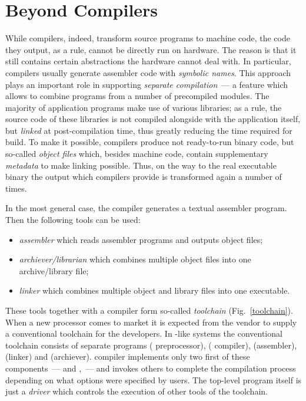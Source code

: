 \section{Beyond Compilers}

While compilers, indeed, transform source programs to machine code, the code they output, as a rule, cannot be directly run on hardware.
The reason is that it still contains certain abstractions the hardware cannot deal with. In particular, compilers usually generate
assembler code with \emph{symbolic names}. This approach plays an important role in supporting \emph{separate compilation}~--- a
feature which allows to combine programs from a number of precompiled modules. The majority of application programs
make use of various libraries; as a rule, the source code of these libraries is not compiled alongside with the application itself, but
\emph{linked} at post-compilation time, thus greatly reducing the time required for build. To make it possible, compilers
produce not ready-to-run binary code, but so-called \emph{object files} which, besides machine code, contain supplementary
\emph{metadata} to make linking possible. Thus, on the way to the real executable binary the output which compilers provide
is transformed again a number of times.

In the most general case, the compiler generates a textual assembler program. Then the following tools can be used:

\begin{itemize}
\item \emph{assembler} which reads assembler programs and outputs object files;
\item \emph{archiever/librarian} which combines multiple object files into one archive/library file;
\item \emph{linker} which combines multiple object and library files into one executable.
\end{itemize}

These tools together with a compiler form so-called \emph{toolchain} (Fig.~\ref{toolchain}). When a new processor comes to market it is expected from
the vendor to supply a conventional toolchain for the developers. In -like systems the conventional
toolchain consists of separate programs  ( preprocessor),  ( compiler),
 (assembler),  (linker) and  (archiever).  compiler implements only two first
of these components~---  and ,~--- and invokes others to complete the compilation process
depending on what options were specified by users. The top-level program  itself is just a \emph{driver}
which controls the execution of other tools of the toolchain. 



